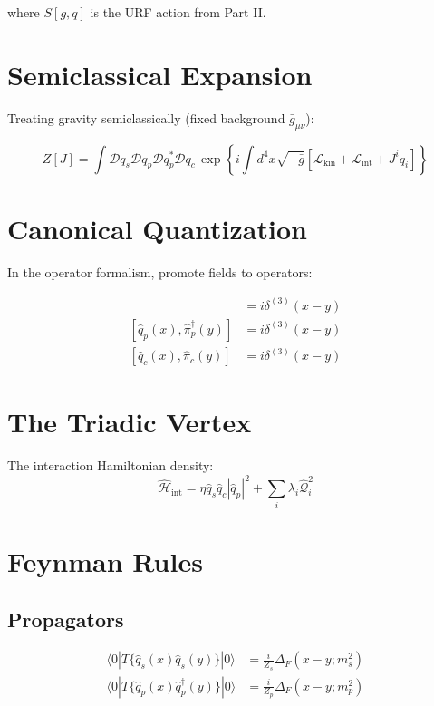 \documentclass[openany]{memoir}
\theoremstyle{definition}
\theoremstyle{plain}
\theoremstyle{remark}
\begin{document}
where $S[g,q]$ is the URF action from Part II.

\section{Semiclassical Expansion}

Treating gravity semiclassically (fixed background $\bar{g}_{\mu\nu}$):

\begin{equation}
Z[J] = \int \mathcal{D}q_s \mathcal{D}q_p \mathcal{D}q_p^* \mathcal{D}q_c \, \exp\left\{i\int d^4x\sqrt{-\bar{g}} \left[\mathcal{L}_{\text{kin}} + \mathcal{L}_{\text{int}} + J^i q_i\right]\right\}
\end{equation}

\section{Canonical Quantization}

In the operator formalism, promote fields to operators:

\begin{align}
[\hat{q}_s(x), \hat{\pi}_s(y)] &= i\delta^{(3)}(x-y) \\
[\hat{q}_p(x), \hat{\pi}_p^\dagger(y)] &= i\delta^{(3)}(x-y) \\
[\hat{q}_c(x), \hat{\pi}_c(y)] &= i\delta^{(3)}(x-y)
\end{align}

\section{The Triadic Vertex}

The interaction Hamiltonian density:
\begin{equation}
\hat{\mathcal{H}}_{\text{int}} = \eta \hat{q}_s \hat{q}_c |\hat{q}_p|^2 + \sum_i \lambda_i \hat{\mathcal{Q}}_i^2
\end{equation}

\section{Feynman Rules}

\subsection{Propagators}
\begin{align}
\langle 0 | T\{\hat{q}_s(x)\hat{q}_s(y)\} | 0 \rangle &= \frac{i}{Z_s} \Delta_F(x-y; m_s^2) \\
\langle 0 | T\{\hat{q}_p(x)\hat{q}_p^\dagger(y)\} | 0 \rangle &= \frac{i}{Z_p} \Delta_F(x-y; m_p^2)
\end{align}
\end{document}

